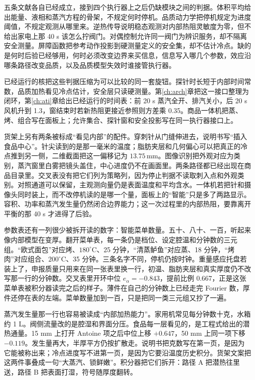 五条文献各自已经成立，接到四个执行器上之后仍缺模块之间的判据。体积平均给出能量、液相和蒸汽方程的骨架，不规定何时停机。品质动力学把停机规定为进度阈值，不规定观测从哪里来。逆热传导说明稳态观测对内部热阻灵敏度为零，但不给出家电上那 40 s 该怎么拧阀门。对偶控制允许同一阀门为辨识服务，却不隔离安全测量。屏障函数把参考动作投影到硬测量定义的安全集，却不估计冷点。缺的是何时后验已经够用，何时必须改变边界来买信息，信息写入哪几个参数，效应沿哪条路径改变品质，以及品质模型失效时谁接管执行器。

已经运行的核把这些判据压缩为可以比较的同一套旋钮。探针时长短于内部时间常数，品质加热看见冷点估计，安全层只读硬测量。第\ref{ch:arch}章把这一接口整理为闭环，第\ref{ch:ati}章给出已经运行的时间表：前 20 s 蒸汽全开、排汽关小，后 20 s 风机升到 1.3，窗结束时若新热阻更接近参照则方差乘 0.35。商品一体机把蒸、烤、组合写在面板上；允许集合、探针窗和安全投影写在同一执行器接口上。

货架上另有两条被标成“看见内部”的配件。穿刺针从门缝伸进去，说明书写“插入食品中心”。针尖读到的是那一毫米的温度；脂肪夹层和几何偏心可以把真正的冷点推到另一侧，二维截面把这一偏移记为 \(13.75\,\mathrm{mm}\)。图像识别把外观对应为类别，蒸汽窗里白雾把镜头盖住，中心进度仍不在画面里。两条路径都已经出现在商品目录里。交叉表没有把它们列为策略列，因为停止判据不读取刺入点和外观类别。对照通道可以保留，主观测向量仍是表面温度和平均含水。一体机若把针和摄像头同时装上，而不改停机读的是哪一个量，面板上的“智能”只是多了两路显示。容积、功率和蒸汽发生量仍然闭合边界能力；这一次过程里的内部热阻，要靠离开平衡的那 40 s 才进得了后验。

参数表还有一列很少被拆开读的数字：智能菜单数量。五十、八十、一百，听起来像内部模型在变厚。翻开菜单表，每一条仍是档位、设定腔温和分钟数的三元组。“欧式面包”对应烤、\(180^\circ\mathrm{C}\)、25 分钟，“清蒸鲈鱼”对应蒸、18 分钟，“烤肉”对应组合、\(200^\circ\mathrm{C}\)、35 分钟。三条名字不同，停机仍按时钟。重量感应托盘若装上了，申报质量只用来在同一张表里换一行，初温、脂肪夹层和真实厚度仍不改写那一行的分钟数。交叉表里开环中位 \(e_{\alpha}=-0.843\)，提前比例 0.667，正是这张菜单表被积分器读完之后的样子。薄件在自己的分钟数上已经走完 Fourier 数，厚件还停在表的左端。菜单数量加到一百，只是把同一类三元组又抄了一遍。

蒸汽发生量那一行也容易被读成“内部加热能力”。家用机常见每分钟数十克，水箱约 1 L。阀侧流量改的是腔湿和界面分压。食品每一层看见的，是工程式给出的潜热通量。15 mm 上打开 Antoine 项之后中位上移 \(+0.647\)，50 mm 上同一项下移 \(-0.119\)。发生量再大，半厚平方仍按扩散走。说明书把克数写在第一页，是因为它能被称出来；冷点进度写不进第一页，是因为它要沿温度历史积分。货架文案把这两件事叠成一句“大蒸汽、锁鲜嫩”。积分器把它们拆开：路径 A 把潜热往里送，路径 B 把表面打湿，符号随厚度翻转。

